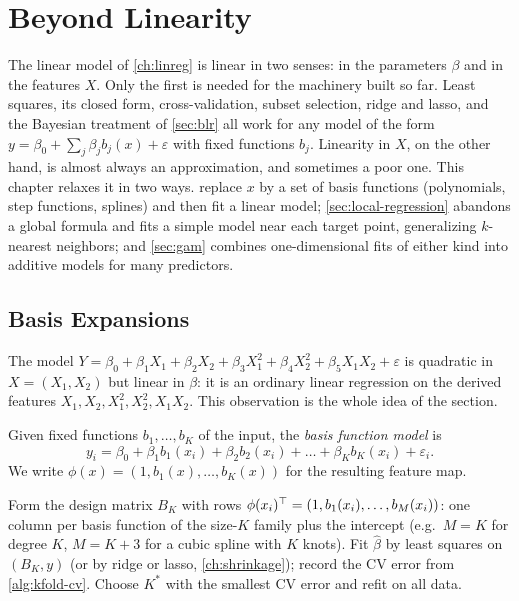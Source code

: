 \chapter{Beyond Linearity}\label{ch:nonlinear}

The linear model of \cref{ch:linreg} is linear in two senses: in the parameters $\beta$ and in the features $X$. Only the first is needed for the machinery built so far. Least squares, its closed form, cross-validation, subset selection, ridge and lasso, and the Bayesian treatment of \cref{sec:blr} all work for any model of the form $y=\beta_0+\sum_j\beta_jb_j(x)+\varepsilon$ with fixed functions $b_j$. Linearity in $X$, on the other hand, is almost always an approximation, and sometimes a poor one. This chapter relaxes it in two ways.  replace $x$ by a set of basis functions (polynomials, step functions, splines) and then fit a linear model; \cref{sec:local-regression} abandons a global formula and fits a simple model near each target point, generalizing $k$-nearest neighbors; and \cref{sec:gam} combines one-dimensional fits of either kind into additive models for many predictors.

\section{Basis Expansions}\label{sec:basis}

The model $Y=\beta_0+\beta_1X_1+\beta_2X_2+\beta_3X_1^2+\beta_4X_2^2+\beta_5X_1X_2+\varepsilon$ is quadratic in $X=(X_1,X_2)$ but linear in $\beta$: it is an ordinary linear regression on the derived features $X_1,X_2,X_1^2,X_2^2,X_1X_2$. This observation is the whole idea of the section.

\begin{definition}\label{def:basis-expansion}
Given fixed functions $b_1,\dots,b_K$ of the input, the \emph{basis function model} is
\[
y_i=\beta_0+\beta_1b_1(x_i)+\beta_2b_2(x_i)+\dots+\beta_Kb_K(x_i)+\varepsilon_i .
\]
We write $\phi(x)=(1,b_1(x),\dots,b_K(x))$ for the resulting feature map.
\end{definition}

\begin{algorithm}[H]
\caption{Regression with a Basis Expansion}\label{alg:basis-fit}
\begin{algorithmic}[1]
  \State Form the design matrix $B_K$ with rows $\phi(x_i)^{\top}=(1,b_1(x_i),\dots,b_M(x_i))$: one column per basis function of the size-$K$ family plus the intercept (e.g.\ $M=K$ for degree $K$, $M=K+3$ for a cubic spline with $K$ knots).
  \State Fit $\hat\beta$ by least squares on $(B_K,y)$ (or by ridge or lasso, \cref{ch:shrinkage}); record the CV error from \cref{alg:kfold-cv}.
\EndFor
\State Choose $K^*$ with the smallest CV error and refit on all data.
\end{algorithmic}
\end{algorithm}

